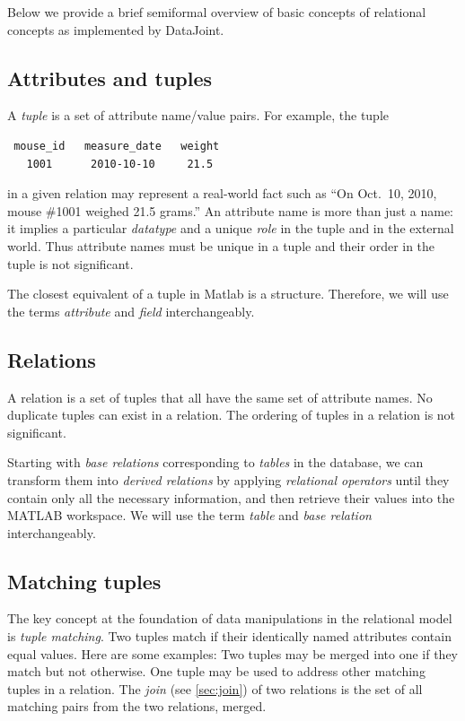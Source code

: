 \documentclass[10pt]{article}
\begin{document}
Below we provide a brief semiformal overview of basic concepts of relational concepts as implemented by DataJoint.  

\subsection{Attributes and tuples}
A {\em tuple} is a set of attribute name/value pairs. For example, the tuple
\begin{verbatim}
 mouse_id   measure_date   weight 
   1001      2010-10-10     21.5
\end{verbatim}

in a given relation may represent a real-world fact such as ``On Oct.~10, 2010, mouse \#1001 weighed 21.5 grams.''  An attribute name is more than just a name: it implies a particular {\em datatype} and a unique {\em role} in the tuple and in the external world.  Thus attribute names must be unique in a tuple and their order in the tuple is not significant.  

The closest equivalent of a tuple in Matlab is a structure. Therefore, we will use the terms {\em attribute} and {\em field} interchangeably.


\subsection{Relations}
A relation is a set of tuples that all have the same set of attribute names. No duplicate tuples can exist in a relation.  The ordering of tuples in a relation is not significant.  

Starting with {\em base relations} corresponding to {\em tables} in the database, we can transform them into {\em derived relations} by applying {\em relational operators} until they contain only all the necessary information, and then retrieve their values into the MATLAB workspace.  We will use the term {\em table} and {\em base relation} interchangeably. 

\subsection{Matching tuples}\label{sec:matching}
The key concept at the foundation of data manipulations in the relational model is {\em tuple matching}.  Two tuples match if their identically named attributes contain equal values.  Here are some examples: Two tuples may be merged into one if they match but not otherwise.  One tuple may be used to address other matching tuples in a relation.  The {\em join} (see \autoref{sec:join}) of two relations is the set of all matching pairs from the two relations, merged.
\end{document}
